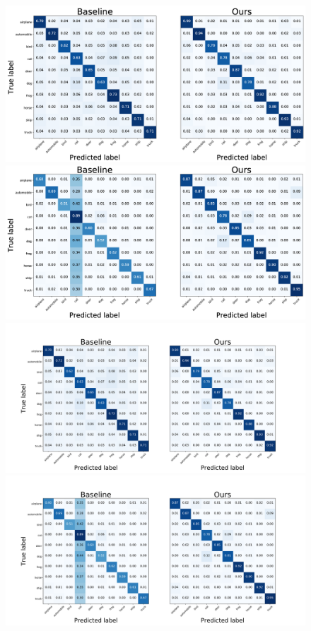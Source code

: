 \begin{figure}[h!]
\centering
\vspace{-0.1in}
\iflatexml
\includegraphics[width=3\columnwidth]{figures/cifar-noise-cm.png}
\includegraphics[width=3\columnwidth]{figures/cifar-imbalance-cm.png}
\else
\includegraphics[width=\columnwidth,trim={2.5cm 0 4cm 0},clip]{figures/cifar-noise-cm.pdf}
\includegraphics[width=\columnwidth,trim={2.5cm 0 4cm 0},clip]{figures/cifar-imbalance-cm.pdf}

\end{figure}
